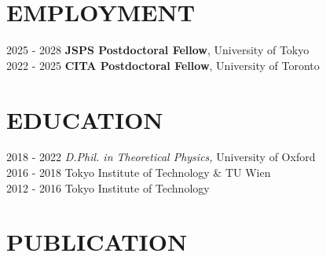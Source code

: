 \documentclass[]{res}
\begin{document}
\begin{resume}

\section{EMPLOYMENT}
\noindent
\begin{tabbing}
    2025 - 2028 \hspace{2mm} \=\textbf{JSPS Postdoctoral Fellow}, University of Tokyo\\
    2022 - 2025 \hspace{2mm} \=\textbf{CITA Postdoctoral Fellow}, University of Toronto
\end{tabbing}

\section{EDUCATION}
\noindent
\begin{tabbing}
    2018 - 2022 \hspace{2mm} \={\sl D.Phil. in Theoretical Physics,} University of Oxford\\
    2016 - 2018 \hspace{2mm}  Tokyo Institute of Technology \& TU Wien\\ 
    2012 - 2016 \hspace{2mm}  Tokyo Institute of Technology
\end{tabbing}

\section{PUBLICATION}
\noindent

\end{resume}
\end{document}
